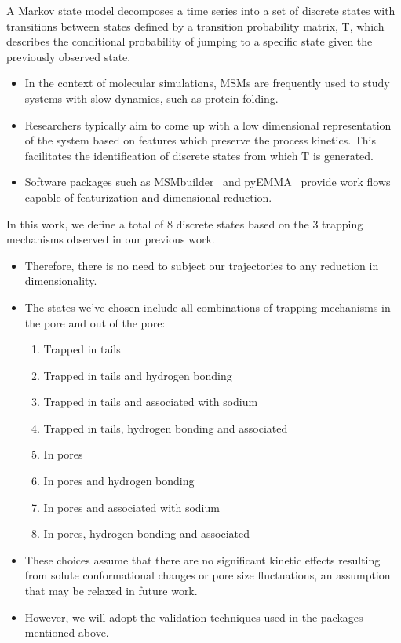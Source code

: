 \documentclass{article}
\begin{document}
  A Markov state model decomposes a time series into a set of discrete states
  with transitions between states defined by a transition probability matrix, T,
  which describes the conditional probability of jumping to a specific 
  state given the previously observed state.~\cite{pande_everything_2010,wehmeyer_introduction_2018}
  \begin{itemize}
    \item In the context of molecular simulations, MSMs are frequently used
    to study systems with slow dynamics, such as protein folding.~\cite{snow_how_2005,chodera_automatic_2007}
    \item Researchers typically aim to come up with a low dimensional 
    representation of the system based on features which preserve the process
    kinetics. This facilitates the identification of discrete states from
    which T is generated.
    \item Software packages such as MSMbuilder~\cite{beauchamp_msmbuilder2:_2011}
    and pyEMMA~\cite{scherer_pyemma_2015} provide work flows capable 
    of featurization and dimensional reduction.
  \end{itemize}
  
  In this work, we define a total of 8 discrete states based on the 3 trapping
  mechanisms observed in our previous work. 
  \begin{itemize}
  	\item Therefore, there is no need to subject our trajectories to any reduction
  	in dimensionality. 
  	\item The states we've chosen include all combinations of trapping mechanisms 
  	in the pore and out of the pore:
  	\begin{enumerate}
  	  \item Trapped in tails
  	  \item Trapped in tails and hydrogen bonding
  	  \item Trapped in tails and associated with sodium
  	  \item Trapped in tails, hydrogen bonding and associated
  	  \item In pores
  	  \item In pores and hydrogen bonding
  	  \item In pores and associated with sodium
  	  \item In pores, hydrogen bonding and associated
  	\end{enumerate}
  	\item These choices assume that there are no significant kinetic effects resulting
  	from solute conformational changes or pore size fluctuations, an assumption 
  	that may be relaxed in future work.
  	\item However, we will adopt the validation techniques used in the packages
  	mentioned above.  
  \end{itemize}
  
\end{document}
